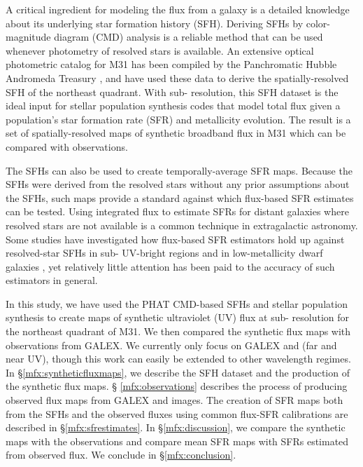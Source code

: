 A critical ingredient for modeling the flux from a galaxy is a detailed
knowledge about its underlying star formation history (SFH). Deriving SFHs by
color-magnitude diagram (CMD) analysis is a reliable method that can be used
whenever photometry of resolved stars is available. An extensive optical
photometric catalog for M31 has been compiled by the Panchromatic Hubble
Andromeda Treasury \citep[PHAT][]{Dalcanton:2012}, and \citet{Lewis:2014} have
used these data to derive the spatially-resolved SFH of the northeast quadrant.
With sub-\kpc{} resolution, this SFH dataset is the ideal input for stellar
population synthesis codes that model total flux given a population's star
formation rate (SFR) and metallicity evolution. The result is a set of
spatially-resolved maps of synthetic broadband flux in M31 which can be
compared with observations.

The \citet{Lewis:2014} SFHs can also be used to create temporally-average SFR
maps. Because the SFHs were derived from the resolved stars without any prior
assumptions about the SFHs, such maps provide a standard against which
flux-based SFR estimates \citep[e.g., using any of the calibrations
from][]{Kennicutt:2012} can be tested. Using integrated flux to estimate SFRs
for distant galaxies where resolved stars are not available is a common
technique in extragalactic astronomy. Some studies have investigated how
flux-based SFR estimators hold up against resolved-star SFHs in sub-\kpc{}
UV-bright regions \citep{Simones:2014} and in low-metallicity dwarf galaxies
\citep{McQuinn:2014}, yet relatively little attention has been paid to the
accuracy of such estimators in general.

In this study, we have used the PHAT CMD-based SFHs and stellar population
synthesis to create maps of synthetic ultraviolet (UV) flux at sub-\kpc{}
resolution for the northeast quadrant of M31. We then compared the synthetic
flux maps with observations from GALEX. We currently only focus on GALEX \fuv{}
and \nuv{} (far and near UV), though this work can easily be extended to other
wavelength regimes. In \S \ref{mfx:syntheticfluxmaps}, we describe the SFH
dataset and the production of the synthetic flux maps. \S
\ref{mfx:observations} describes the process of producing observed flux maps
from GALEX \fuv{} and \nuv{} images. The creation of SFR maps both from the
SFHs and the observed fluxes using common flux-SFR calibrations are described
in \S \ref{mfx:sfrestimates}. In \S \ref{mfx:discussion}, we compare the
synthetic maps with the observations and compare mean SFR maps with SFRs
estimated from observed flux. We conclude in \S \ref{mfx:conclusion}.





